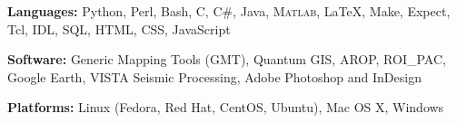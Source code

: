 

\textbf{Languages:} Python, Perl, Bash, C, C\#, Java, \textsc{Matlab}, \LaTeX, Make, Expect, Tcl, IDL, SQL, HTML, CSS, JavaScript

\vspace{5pt}

\textbf{Software:} Generic Mapping Tools (GMT), Quantum GIS, AROP, ROI\_PAC, Google Earth, VISTA Seismic Processing, Adobe Photoshop and InDesign

\vspace{5pt}

\textbf{Platforms:} Linux (Fedora, Red Hat, CentOS, Ubuntu), Mac OS X, Windows
